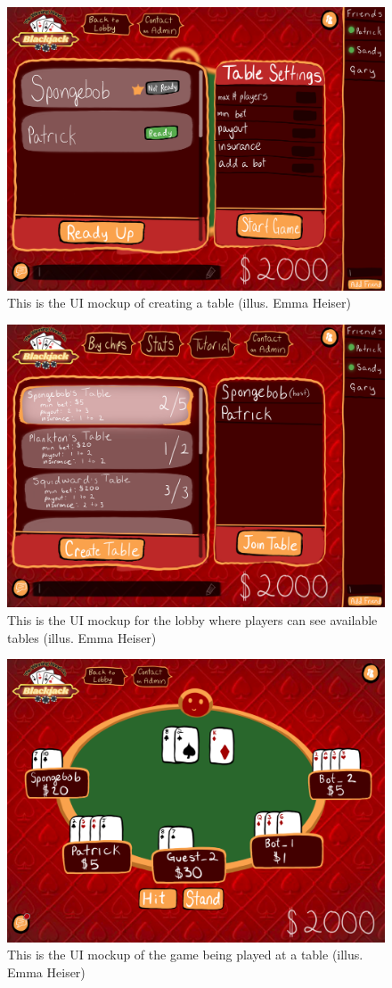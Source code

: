 \begin{figure}[hbt!]
    \centering
    \includegraphics[width=0.75\linewidth]{figures/at-table.png}
    \caption{This is the UI mockup of creating a table (illus. Emma Heiser)}
    \label{fig:table}
\end{figure}

\pagebreak

\begin{figure}[hbt!]
    \centering
    \includegraphics[width=0.75\linewidth]{figures/lobby.png}
    \caption{This is the UI mockup for the lobby where players can see available tables (illus. Emma Heiser)}
    \label{fig:lobby}
\end{figure}

\begin{figure}[hbt!]
    \centering
    \includegraphics[width=0.75\linewidth]{figures/in-game.png}
    \caption{This is the UI mockup of the game being played at a table (illus. Emma Heiser)}
    \label{fig:game}
\end{figure}

\pagebreak
